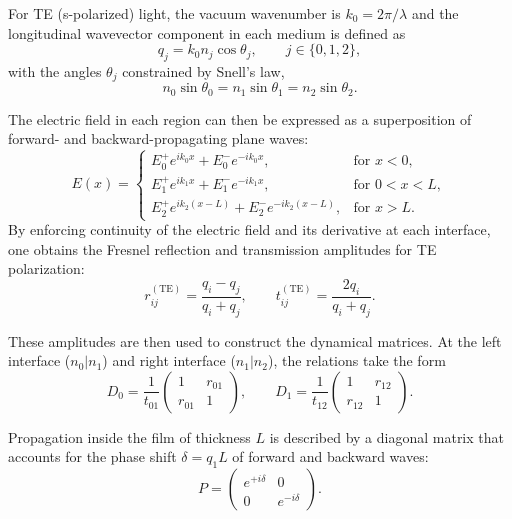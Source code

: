 For TE (s-polarized) light, the vacuum wavenumber is $k_0 = 2\pi/\lambda$ and the longitudinal wavevector component in each medium is defined as
\begin{equation}
q_j = k_0 n_j \cos\theta_j, 
\qquad j \in \{0,1,2\},
\label{eq:q_def}
\end{equation}
with the angles $\theta_j$ constrained by Snell’s law,
\begin{equation}
n_0 \sin\theta_0 = n_1 \sin\theta_1 = n_2 \sin\theta_2.
\label{eq:snell}
\end{equation}

The electric field in each region can then be expressed as a superposition of forward- and backward-propagating plane waves:
\begin{equation}
E(x)=
\begin{cases}
E_0^{+} e^{i k_0 x} + E_0^{-} e^{-i k_0 x}, & \text{for } x<0,\\[4pt]
E_1^{+} e^{i k_1 x} + E_1^{-} e^{-i k_1 x}, & \text{for } 0<x<L,\\[4pt]
E_2^{+} e^{i k_2 (x-L)} + E_2^{-} e^{-i k_2 (x-L)}, & \text{for } x>L.
\end{cases}
\label{eq:Ex_f}
\end{equation}
By enforcing continuity of the electric field and its derivative at each interface, one obtains the Fresnel reflection and transmission amplitudes for TE polarization:
\begin{equation}
r_{ij}^{(\mathrm{TE})} = \frac{q_i - q_j}{q_i + q_j}, 
\qquad
t_{ij}^{(\mathrm{TE})} = \frac{2 q_i}{q_i + q_j}.
\label{eq:fresnel}
\end{equation}

These amplitudes are then used to construct the dynamical matrices. 
At the left interface ($n_0|n_1$) and right interface ($n_1|n_2$), the relations take the form
\begin{equation}
D_0 = \frac{1}{t_{01}}
\begin{pmatrix}
1 & r_{01} \\
r_{01} & 1
\end{pmatrix}, 
\qquad
D_1 = \frac{1}{t_{12}}
\begin{pmatrix}
1 & r_{12} \\
r_{12} & 1
\end{pmatrix}.
\label{eq:D_matrices}
\end{equation}

Propagation inside the film of thickness $L$ is described by a diagonal matrix that accounts for the phase shift $\delta = q_1 L$ of forward and backward waves:
\begin{equation}
P =
\begin{pmatrix}
e^{+i\delta} & 0 \\
0 & e^{-i\delta}
\end{pmatrix}.
\label{eq:P_matrix}
\end{equation}

